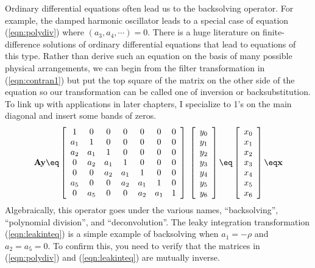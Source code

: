 \par
Ordinary differential equations often lead us to the backsolving operator.
For example, the damped harmonic oscillator leads to
a special case of equation
(\ref{eqn:polydiv})
where $(a_3,a_4,\cdots)=0$.
There is a huge literature on finite-difference solutions
of ordinary differential equations
that lead to equations of this type.
Rather than derive such an equation on the basis
of many possible physical arrangements,
we can begin from the filter transformation in (\ref{eqn:contran1})
but put the top square of the matrix on the other side of the equation
so our transformation can be called one of inversion or backsubstitution.
To link up with applications in later chapters,
I specialize to 1's on the main diagonal and insert some bands of zeros.
\begin{equation}
\bold A \bold y
\eq
\left[ 
\begin{array}{ccccccc}
   1  & 0   & 0    & 0   & 0   & 0   & 0  \\
  a_1 &  1  & 0    & 0   & 0   & 0   & 0  \\
  a_2 & a_1 &  1   & 0   & 0   & 0   & 0  \\
  0   & a_2 & a_1  &  1  & 0   & 0   & 0  \\
  0   & 0   & a_2  & a_1 &  1  & 0   & 0  \\
  a_5 & 0   & 0    & a_2 & a_1 &  1  & 0  \\
  0   & a_5 & 0    &   0 & a_2 & a_1 & 1
  \end{array} \right] 
\; \left[ 
\begin{array}{c}
  y_0 \\ 
  y_1 \\ 
  y_2 \\ 
  y_3 \\ 
  y_4 \\ 
  y_5 \\ 
  y_6
  \end{array} \right]
\eq
\left[ 
\begin{array}{c}
  x_0 \\ 
  x_1 \\ 
  x_2 \\ 
  x_3 \\ 
  x_4 \\ 
  x_5 \\ 
  x_6
  \end{array} \right] 
\eq
\bold x
\label{eqn:polydiv}
\end{equation}
Algebraically, this operator goes under the various names,
``backsolving'',
``polynomial division'', and
``deconvolution''.
The leaky integration transformation
(\ref{eqn:leakinteq})
is a simple example of backsolving
when $a_1=-\rho$ and $a_2=a_5=0$.
To confirm this, you need to verify that the matrices in
(\ref{eqn:polydiv})
and
(\ref{eqn:leakinteq})
are mutually inverse.

